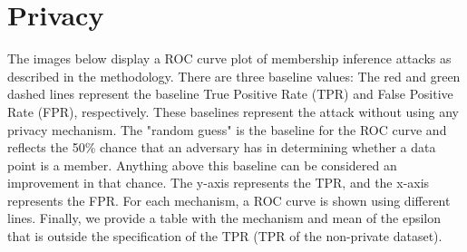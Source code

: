 \section{Privacy}
The images below display a ROC curve plot of membership inference attacks as described in the methodology.
There are three baseline values: The red and green dashed lines represent the baseline True Positive Rate (TPR) and False Positive Rate (FPR), respectively. These baselines represent the attack without using any privacy mechanism. The "random guess" is the baseline for the ROC curve and reflects the 50\% chance that an adversary has in determining whether a data point is a member. Anything above this baseline can be considered an improvement in that chance.
The y-axis represents the TPR, and the x-axis represents the FPR. For each mechanism, a ROC curve is shown using different lines.
Finally, we provide a table with the mechanism and mean of the epsilon that is outside the specification of the TPR (TPR of the non-private dataset).
